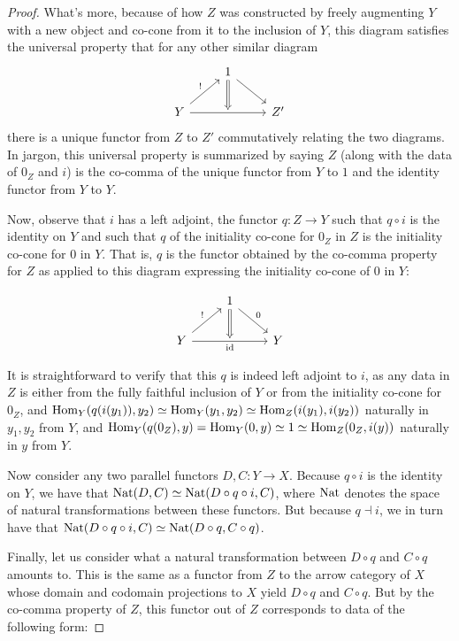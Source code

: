 \begin{proof}
What's more, because of how $Z$ was constructed by freely augmenting $Y$ with a new object and co-cone from it to the inclusion of $Y$, this diagram satisfies the universal property that for any other similar diagram
\[\begin{tikzcd}
	& 1 \\
	Y && Z'
	\arrow["\unique", from=2-1, to=1-2]
	\arrow[from=1-2, to=2-3]
	\arrow[""{name=0, anchor=center}, from=2-1, to=2-3]
	\arrow[Rightarrow, from=1-2, to=0]
\end{tikzcd}\]
there is a unique functor from $Z$ to $Z'$ commutatively relating the two diagrams. In jargon, this universal property is summarized by saying $Z$ (along with the data of $0_Z$ and $i$) is the co-comma of the unique functor from $Y$ to $1$ and the identity functor from $Y$ to $Y$.

Now, observe that $i$ has a left adjoint, the functor $q : Z \to Y$ such that $q \circ i$ is the identity on $Y$ and such that $q$ of the initiality co-cone for $0_Z$ in $Z$ is the initiality co-cone for $0$ in $Y$. That is, $q$ is the functor obtained by the co-comma property for $Z$ as applied to this diagram expressing the initiality co-cone of $0$ in $Y$:

\[\begin{tikzcd}
	& 1 \\
	Y && Y
	\arrow["\unique", from=2-1, to=1-2]
	\arrow["{0}", from=1-2, to=2-3]
	\arrow[""{name=0, anchor=center}, "\id"', from=2-1, to=2-3]
	\arrow[Rightarrow, from=1-2, to=0]
\end{tikzcd}\]

It is straightforward to verify that this $q$ is indeed left adjoint to $i$, as any data in $Z$ is either from the fully faithful inclusion of $Y$ or from the initiality co-cone for $0_Z$, and $\operatorname{Hom}_Y(q(i(y_1)), y_2) \simeq \operatorname{Hom}_Y(y_1, y_2) \simeq \operatorname{Hom}_Z(i(y_1), i(y_2))$ naturally in $y_1, y_2$ from $Y$, and $\operatorname{Hom}_Y(q(0_Z), y) = \operatorname{Hom}_Y(0, y) \simeq 1 \simeq \operatorname{Hom}_Z(0_Z, i(y))$ naturally in $y$ from $Y$.

Now consider any two parallel functors $D, C : Y \to X$. Because $q \circ i$ is the identity on $Y$, we have that $\operatorname{Nat}(D, C) \simeq \operatorname{Nat}(D \circ q \circ i, C)$, where $\operatorname{Nat}$ denotes the space of natural transformations between these functors. But because $q \dashv i$, we in turn have that $\operatorname{Nat}(D \circ q \circ i, C) \simeq \operatorname{Nat}(D \circ q, C \circ q)$.

Finally, let us consider what a natural transformation between $D \circ q$ and $C \circ q$ amounts to. This is the same as a functor from $Z$ to the arrow category of $X$ whose domain and codomain projections to $X$ yield $D \circ q$ and $C \circ q$. But by the co-comma property of $Z$, this functor out of $Z$ corresponds to data of the following form:


\end{proof}
